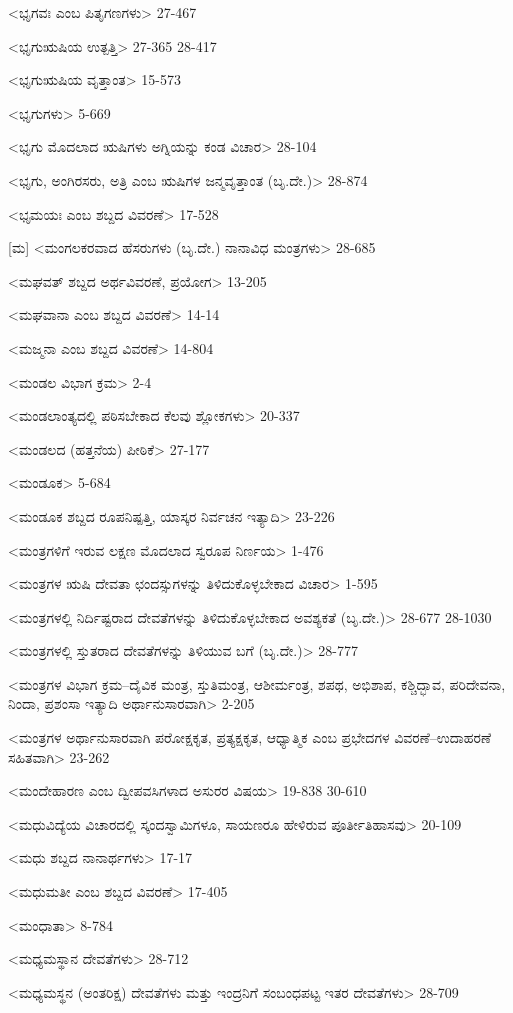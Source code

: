 <ಭೃಗವಃ ಎಂಬ ಪಿತೃಗಣಗಳು>
27-467

<ಭೃಗುಋಷಿಯ ಉತ್ಪತ್ತಿ>
27-365 
28-417

<ಭೃಗುಋಷಿಯ ವೃತ್ತಾಂತ>
15-573

<ಭೃಗುಗಳು>
5-669

<ಭೃಗು ಮೊದಲಾದ ಋಷಿಗಳು ಅಗ್ನಿಯನ್ನು ಕಂಡ ವಿಚಾರ>
28-104

<ಭೃಗು, ಅಂಗಿರಸರು, ಅತ್ರಿ ಎಂಬ ಋಷಿಗಳ ಜನ್ಮವೃತ್ತಾಂತ (ಬೃ.ದೇ.)>
28-874

<ಭೃಮಯಃ ಎಂಬ ಶಬ್ದದ ವಿವರಣೆ>
17-528

[ಮ]
<ಮಂಗಲಕರವಾದ ಹೆಸರುಗಳು (ಬೃ.ದೇ.) ನಾನಾವಿಧ ಮಂತ್ರಗಳು>
28-685

<ಮಘವತ್‍ ಶಬ್ದದ ಅರ್ಥವಿವರಣೆ, ಪ್ರಯೋಗ>
13-205

<ಮಘವಾನಾ ಎಂಬ ಶಬ್ದದ ವಿವರಣೆ>
14-14

<ಮಜ್ಮನಾ ಎಂಬ ಶಬ್ದದ ವಿವರಣೆ>
14-804

<ಮಂಡಲ ವಿಭಾಗ ಕ್ರಮ>
2-4

<ಮಂಡಲಾಂತ್ಯದಲ್ಲಿ ಪಠಿಸಬೇಕಾದ ಕೆಲವು ಶ್ಲೋಕಗಳು>
20-337

<ಮಂಡಲದ (ಹತ್ತನೆಯ) ಪೀಠಿಕೆ>
27-177

<ಮಂಡೂಕ>
5-684

<ಮಂಡೂಕ ಶಬ್ದದ ರೂಪನಿಷ್ಪತ್ತಿ, ಯಾಸ್ಕರ ನಿರ್ವಚನ ಇತ್ಯಾದಿ>
23-226

<ಮಂತ್ರಗಳಿಗೆ ಇರುವ ಲಕ್ಷಣ ಮೊದಲಾದ ಸ್ವರೂಪ ನಿರ್ಣಯ>
1-476

<ಮಂತ್ರಗಳ ಋಷಿ ದೇವತಾ ಛಂದಸ್ಸುಗಳನ್ನು ತಿಳಿದುಕೊಳ್ಳಬೇಕಾದ ವಿಚಾರ>
1-595

<ಮಂತ್ರಗಳಲ್ಲಿ ನಿರ್ದಿಷ್ಟರಾದ ದೇವತೆಗಳನ್ನು ತಿಳಿದುಕೊಳ್ಳಬೇಕಾದ ಅವಶ್ಯಕತೆ (ಬೃ.ದೇ.)>
28-677
28-1030

<ಮಂತ್ರಗಳಲ್ಲಿ ಸ್ತುತರಾದ ದೇವತೆಗಳನ್ನು ತಿಳಿಯುವ ಬಗೆ (ಬೃ.ದೇ.)>
28-777

<ಮಂತ್ರಗಳ ವಿಭಾಗ ಕ್ರಮ–ದೈವಿಕ ಮಂತ್ರ, ಸ್ತುತಿಮಂತ್ರ, ಆಶೀರ್ಮಂತ್ರ, ಶಪಥ, ಅಭಿಶಾಪ, ಕಶ್ಚಿದ್ಭಾವ, ಪರಿದೇವನಾ, ನಿಂದಾ, ಪ್ರಶಂಸಾ ಇತ್ಯಾದಿ ಅರ್ಥಾನುಸಾರವಾಗಿ>
2-205

<ಮಂತ್ರಗಳ ಅರ್ಥಾನುಸಾರವಾಗಿ ಪರೋಕ್ಷಕೃತ, ಪ್ರತ್ಯಕ್ಷಕೃತ, ಆಧ್ಯಾತ್ಮಿಕ ಎಂಬ ಪ್ರಭೇದಗಳ ವಿವರಣೆ–ಉದಾಹರಣೆ ಸಹಿತವಾಗಿ>
23-262

<ಮಂದೇಹಾರಣ ಎಂಬ ದ್ವೀಪವಸಿಗಳಾದ ಅಸುರರ ವಿಷಯ>
19-838
30-610

<ಮಧುವಿದ್ಯೆಯ ವಿಚಾರದಲ್ಲಿ ಸ್ಕಂದಸ್ವಾಮಿಗಳೂ, ಸಾಯಣರೂ ಹೇಳಿರುವ ಪೂರ್ತೀತಿಹಾಸವು>
20-109

<ಮಧು ಶಬ್ದದ ನಾನಾರ್ಥಗಳು>
17-17

<ಮಧುಮತೀ ಎಂಬ ಶಬ್ದದ ವಿವರಣೆ>
17-405

<ಮಂಧಾತಾ>
8-784

<ಮಧ್ಯಮಸ್ಥಾನ ದೇವತೆಗಳು>
28-712

<ಮಧ್ಯಮಸ್ಥನ (ಅಂತರಿಕ್ಷ) ದೇವತೆಗಳು ಮತ್ತು ಇಂದ್ರನಿಗೆ ಸಂಬಂಧಪಟ್ಟ ಇತರ ದೇವತೆಗಳು>
28-709

